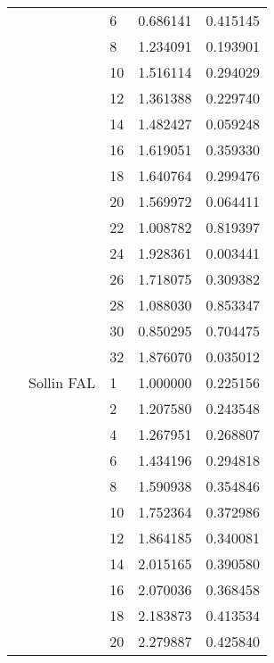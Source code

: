 \begin{tabular}{lllrr}
                      &            & 6  &  0.686141 &  0.415145 \\
                      &            & 8  &  1.234091 &  0.193901 \\
                      &            & 10 &  1.516114 &  0.294029 \\
                      &            & 12 &  1.361388 &  0.229740 \\
                      &            & 14 &  1.482427 &  0.059248 \\
                      &            & 16 &  1.619051 &  0.359330 \\
                      &            & 18 &  1.640764 &  0.299476 \\
                      &            & 20 &  1.569972 &  0.064411 \\
                      &            & 22 &  1.008782 &  0.819397 \\
                      &            & 24 &  1.928361 &  0.003441 \\
                      &            & 26 &  1.718075 &  0.309382 \\
                      &            & 28 &  1.088030 &  0.853347 \\
                      &            & 30 &  0.850295 &  0.704475 \\
                      &            & 32 &  1.876070 &  0.035012 \\
                      & Sollin FAL & 1  &  1.000000 &  0.225156 \\
                      &            & 2  &  1.207580 &  0.243548 \\
                      &            & 4  &  1.267951 &  0.268807 \\
                      &            & 6  &  1.434196 &  0.294818 \\
                      &            & 8  &  1.590938 &  0.354846 \\
                      &            & 10 &  1.752364 &  0.372986 \\
                      &            & 12 &  1.864185 &  0.340081 \\
                      &            & 14 &  2.015165 &  0.390580 \\
                      &            & 16 &  2.070036 &  0.368458 \\
                      &            & 18 &  2.183873 &  0.413534 \\
                      &            & 20 &  2.279887 &  0.425840 \\

\end{tabular}
